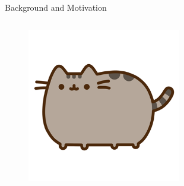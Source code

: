 \begin{columnframe}{Background and Motivation}
    \begin{column}{0.5\textwidth}
        \begin{figure}
            \centering
            \includegraphics[width=0.6\textwidth, frame]{images/pusheen.png}
        \end{figure}
    \end{column}
    \begin{column}{0.5\textwidth}
    \end{column}
\end{columnframe}

